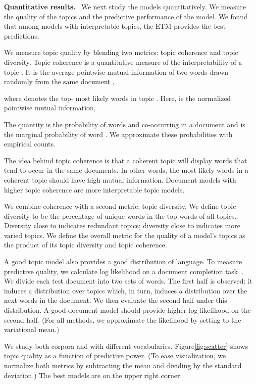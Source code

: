 \documentclass[11pt,a4paper]{article}
\DeclareRobustCommand{\parhead}[1]{\noindent\textbf{#1}~}
\begin{document}
\parhead{Quantitative results.} We next study the models
quantitatively.  We measure the quality of the topics and the
predictive performance of the model.  We found that among models with
interpretable topics, the \gls{ETM} provides the best predictions.

We measure topic quality by blending two metrics: topic coherence and
topic diversity.  Topic coherence is a quantitative measure of the
interpretability of a topic \citep{mimno2011optimizing}.  It is the average pointwise mutual
information of two words drawn randomly from the same document \citep{lau2014machine},

where  denotes the top- most
likely words in topic .  Here,  is the normalized
pointwise mutual information,

The quantity  is the probability of words  and 
co-occurring in a document and  is the marginal probability of
word .  We approximate these probabilities with empirical counts.

The idea behind topic coherence is that a coherent topic will display
words that tend to occur in the same documents. In other words, the
most likely words in a coherent topic should have high mutual
information. Document models with higher topic coherence are more
interpretable topic models.

We combine coherence with a second metric, topic diversity.  We define
topic diversity to be the percentage of unique words in the top 
words of all topics. Diversity close to  indicates redundant
topics; diversity close to  indicates more varied topics.  We define the
overall metric for the quality of a model's topics as the product of
its topic diversity and topic coherence.

A good topic model also provides a good distribution of language.  To
measure predictive quality, we calculate log likelihood on a document
completion task~\citep{rosenzvi2004author,wallach2009evaluation}. We
divide each test document into two sets of words.  The first half is
observed: it induces a distribution over topics which, in turn,
induces a distribution over the next words in the document.  We then
evaluate the second half under this distribution. A good document
model should provide higher log-likelihood on the second half. (For
all methods, we approximate the likelihood by setting  to
the variational mean.)

We study both corpora and with different
vocabularies. Figure\nobreakspace \ref {fig:scatter} shows topic quality as a function of
predictive power. (To ease visualization, we normalize both metrics by
subtracting the mean and dividing by the standard deviation.) The best
models are on the upper right corner.
\end{document}
